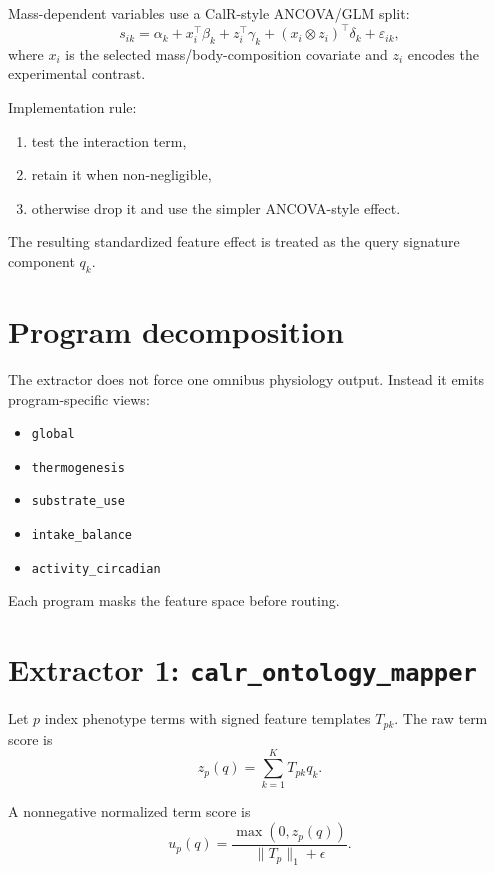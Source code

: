 \documentclass[11pt]{article}
\begin{document}
Mass-dependent variables use a CalR-style ANCOVA/GLM split:
\begin{equation}
s_{ik} = \alpha_k + x_i^\top \beta_k + z_i^\top \gamma_k + (x_i \otimes z_i)^\top \delta_k + \varepsilon_{ik},
\end{equation}
where $x_i$ is the selected mass/body-composition covariate and $z_i$ encodes the experimental contrast.

Implementation rule:
\begin{enumerate}[leftmargin=2em]
\item test the interaction term,
\item retain it when non-negligible,
\item otherwise drop it and use the simpler ANCOVA-style effect.
\end{enumerate}

The resulting standardized feature effect is treated as the query signature component $q_k$.

\section{Program decomposition}
The extractor does not force one omnibus physiology output. Instead it emits program-specific views:
\begin{itemize}[leftmargin=2em]
\item \texttt{global}
\item \texttt{thermogenesis}
\item \texttt{substrate\_use}
\item \texttt{intake\_balance}
\item \texttt{activity\_circadian}
\end{itemize}

Each program masks the feature space before routing.

\section{Extractor 1: \texttt{calr\_ontology\_mapper}}
Let $p$ index phenotype terms with signed feature templates $T_{pk}$. The raw term score is
\begin{equation}
z_p(q) = \sum_{k=1}^{K} T_{pk} q_k.
\end{equation}

A nonnegative normalized term score is
\begin{equation}
u_p(q) = \frac{\max(0, z_p(q))}{\|T_p\|_1 + \epsilon}.
\end{equation}
\end{document}
